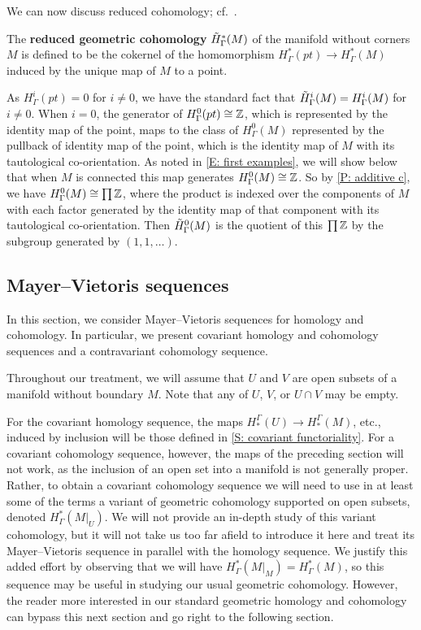We can now discuss reduced cohomology; cf.\ \cite[page 240]{Span81}.

\begin{definition}\label{D: reduced c}
The \textbf{reduced geometric cohomology} $\tilde H^*_\Gamma(M)$ of the manifold without corners $M$ is defined to be the cokernel of the homomorphism $H^*_\Gamma(pt)\to H^*_\Gamma(M)$ induced by the unique map of $M$ to a point.

As $H^i_\Gamma(pt) = 0$ for $i \neq 0$, we have the standard fact that  $\tilde H^i_\Gamma(M) = H^i_\Gamma(M)$ for $i \neq 0$.
When $i=0$, the generator of $H^0_\Gamma(pt) \cong \mathbb{Z}$, which is represented by the identity map of the point, maps to the class of $H^0_\Gamma(M)$ represented by the pullback of identity map of the point, which is the identity map of $M$ with its tautological co-orientation.
As noted in \cref{E: first examples}, we will show below that when $M$ is connected this map generates $H^0_\Gamma(M) \cong \mathbb{Z}$.
So by \cref{P: additive c}, we have $H^0_\Gamma(M) \cong \prod \mathbb{Z}$, where the product is indexed over the components of $M$ with each factor generated by the identity map of that component with its tautological co-orientation.
Then $\tilde H^0_\Gamma(M)$ is the quotient of this $\prod \mathbb{Z}$ by the subgroup generated by $(1,1,\ldots)$.
\end{definition}



\subsection{Mayer--Vietoris sequences}\label{S: MV}

In this section, we consider Mayer--Vietoris sequences for homology and cohomology.
In particular, we present covariant homology and cohomology sequences and a contravariant cohomology sequence.

Throughout our treatment, we will assume that $U$ and $V$ are open subsets of a manifold without boundary $M$.
Note that any of $U$, $V$, or $U \cap V$ may be empty.

For the covariant homology sequence, the maps $H_*^\Gamma(U) \to H_*^\Gamma(M)$, etc., induced by inclusion will be those defined in \cref{S: covariant functoriality}.
For a covariant cohomology sequence, however, the maps of the preceding section will not work, as the inclusion of an open set into a manifold is not generally proper.
Rather, to obtain a covariant cohomology sequence we will need to use in at least some of the terms a variant of geometric cohomology supported on open subsets, denoted $H^*_\Gamma(M|_U)$.
We will not provide an in-depth study of this variant cohomology, but it will not take us too far afield to introduce it here and treat its Mayer--Vietoris sequence in parallel with the homology sequence.
We justify this added effort by observing that we will have $H^*_\Gamma(M|_M) = H^*_\Gamma(M)$, so this sequence may be useful in studying our usual geometric cohomology.
However, the reader more interested in our standard geometric homology and cohomology can bypass this next section and go right to the following section.


